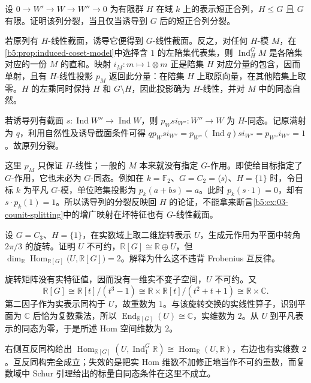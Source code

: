 \begin{exercise}\label{b5:ex:03-induction-reflects-splitting}
	设 \(0\rightarrow W'\rightarrow W\rightarrow W''\rightarrow0\) 为有限群 \(H\) 在域 \(k\) 上的表示短正合列，\(H\le G\) 且 \(G\) 有限。证明该列分裂，当且仅当诱导到 \(G\) 后的短正合列分裂。
\end{exercise}
\begin{solution}
	若原列有 \(H\)-线性截面，诱导它便得到 \(G\)-线性截面。反之，对任何 \(H\)-模 \(M\)，在\cref{b5:prop:induced-coset-model}中选择含 \(1\) 的左陪集代表集，则 \(\operatorname{Ind}_H^G M\) 是各陪集对应的一份 \(M\) 的直和。映射 \(i_M:m\mapsto1\otimes m\) 正是陪集 \(H\) 对应分量的包含，因而单射，且有 \(H\)-线性投影 \(p_M\) 返回此分量：在陪集 \(H\) 上取原向量，在其他陪集上取零。\(H\) 的左乘同时保持 \(H\) 和 \(G\setminus H\)，因此投影确为 \(H\)-线性，并对 \(M\) 中的同态自然。

	若诱导列有截面 \(s:\operatorname{Ind}W''\rightarrow\operatorname{Ind}W\)，则 \(p_W s i_{W''}:W''\rightarrow W\) 为 \(H\)-同态。记原满射为 \(q\)，利用自然性及诱导截面条件可得 \(q p_W s i_{W''}=p_{W''}(\operatorname{Ind}q)s i_{W''}=p_{W''}i_{W''}=1\)。故原列分裂。

	这里 \(p_M\) 只保证 \(H\)-线性；一般的 \(M\) 本来就没有指定 \(G\)-作用。即使给目标指定了 \(G\)-作用，它也未必为 \(G\)-同态。例如在 \(k=\mathbb F_2\)、\(G=C_2=\langle s\rangle\)、\(H=\{1\}\) 时，令目标 \(k\) 为平凡 \(G\)-模，单位陪集投影为 \(p_k(a+bs)=a\)。此时 \(p_k(s\cdot1)=0\)，却有 \(s\cdot p_k(1)=1\)。所以诱导列的分裂反映回 \(H\) 的论证，不能拿来断言\cref{b5:ex:03-counit-splitting}中的增广映射在坏特征也有 \(G\)-线性截面。
\end{solution}

\begin{exercise}\label{b5:ex:03-real-multiplicity}
	设 \(G=C_3\)、\(H=\{1\}\)，在实数域上取二维旋转表示 \(U\)，生成元作用为平面中转角 \(2\pi/3\) 的旋转。证明 \(U\) 不可约，\(\mathbb R[G]\cong\mathbb R\oplus U\)，但 \(\dim_{\mathbb R}\operatorname{Hom}_{\mathbb R[G]}\bigl(U,\mathbb R[G]\bigr)=2\)。解释为什么这不违背 Frobenius 互反律。
\end{exercise}
\begin{solution}
	旋转矩阵没有实特征值，因而没有一维实不变子空间，\(U\) 不可约。又
	\[
		\mathbb R[G]\cong\mathbb R[t]/(t^3-1) \cong\mathbb R\times\mathbb R[t]/(t^2+t+1) \cong\mathbb R\times\mathbb C.
	\]
	第二因子作为实表示同构于 \(U\)，故重数为 \(1\)。与该旋转交换的实线性算子，识别平面为 \(\mathbb C\) 后恰为复数乘法，所以 \(\operatorname{End}_{\mathbb R[G]}(U)\cong\mathbb C\)，实维数为 \(2\)。从 \(U\) 到平凡表示的同态为零，于是所述 Hom 空间维数为 \(2\)。

	右侧互反同构给出 \(\operatorname{Hom}_{\mathbb R[G]}(U,\operatorname{Ind}_1^G\mathbb R)\cong\operatorname{Hom}_{\mathbb R}(U,\mathbb R)\)，右边也有实维数 \(2\)。互反同构完全成立；失效的是把实 Hom 维数不加修正地当作不可约重数，而复数域中 Schur 引理给出的标量自同态条件在这里不成立。
\end{solution}


